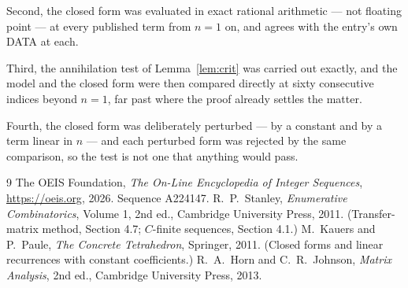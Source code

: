 \documentclass[11pt,a4paper]{article}
\theoremstyle{plain}
\theoremstyle{definition}
\begin{document}
Second, the closed form was evaluated in exact rational arithmetic --- not floating point ---
at every published term from $n=1$ on, and agrees with the entry's own DATA at each.

Third, the annihilation test of Lemma~\ref{lem:crit} was carried out exactly, and the model
and the closed form were then compared directly at sixty consecutive indices beyond
$n=1$, far past where the proof already settles the matter.

Fourth, the closed form was deliberately perturbed --- by a constant and by a term linear in
$n$ --- and each perturbed form was rejected by the same comparison, so the test is not one
that anything would pass.

\begin{thebibliography}{9}
 The OEIS Foundation, \emph{The On-Line Encyclopedia of Integer
Sequences}, \url{https://oeis.org}, 2026. Sequence A224147.
 R.~P.~Stanley, \emph{Enumerative Combinatorics}, Volume 1, 2nd ed.,
Cambridge University Press, 2011. (Transfer-matrix method, Section 4.7; $C$-finite sequences,
Section 4.1.)
 M.~Kauers and P.~Paule, \emph{The Concrete Tetrahedron}, Springer, 2011.
(Closed forms and linear recurrences with constant coefficients.)
 R.~A.~Horn and C.~R.~Johnson, \emph{Matrix Analysis}, 2nd ed., Cambridge
University Press, 2013.
\end{thebibliography}
\end{document}
